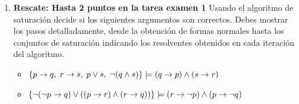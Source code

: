 \documentclass[11pt,letterpaper]{article}
\begin{document}
\begin{enumerate}
\item {\bf Rescate: Hasta 2 puntos en la tarea examen 1} Usando el algoritmo de saturaci\'on decide si los 
  siguientes argumentos son 
  correctos. Debes mostrar los pasos detalladamente, desde la obtenci\'on de 
  formas normales hasta los conjuntos de saturaci\'on indicando los resolventes 
  obtenidos en cada iteraci\'on del algoritmo.

  \begin{itemize}
  \item $\{ p\rightarrow q,\; r\rightarrow s,\; p\lor s,\; \lnot(q\land s)\} \models  (q\rightarrow p)\land (s\rightarrow r)$
  \item $\{\lnot (\lnot p\rightarrow q) \lor ((p\rightarrow r) \land (r\rightarrow q))\} \models
    (r\rightarrow \lnot p) \land (p\rightarrow\lnot q)$
  \end{itemize}
\end{enumerate}
\end{document}
